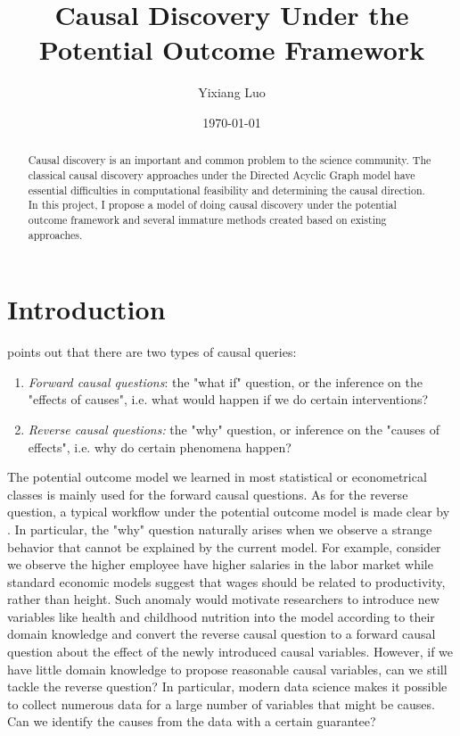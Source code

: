 \documentclass[11pt]{article}
\title{Causal Discovery Under the Potential Outcome Framework}
\author{Yixiang Luo}
\date{\today}
\begin{document}
\maketitle

\begin{abstract}
   Causal discovery is an important and common problem to the science community. The classical causal discovery approaches under the Directed Acyclic Graph model have essential difficulties in computational feasibility and determining the causal direction. In this project, I propose a model of doing causal discovery under the potential outcome framework and several immature methods created based on existing approaches. 
\end{abstract}


\section{Introduction}

\citet{gelman2011causality} points out that there are two types of causal queries:
\begin{enumerate}
    \item \textit{Forward causal questions}: the "what if" question, or the inference on the "effects of causes", i.e. what would happen if we do certain interventions?
    \item \textit{Reverse causal questions:} the "why" question, or inference on the "causes of effects", i.e. why do certain phenomena happen?
\end{enumerate}
The potential outcome model we learned in most statistical or econometrical classes is mainly used for the forward causal questions. As for the reverse question, a typical workflow under the potential outcome model is made clear by \citet{gelman2013ask}. In particular, the "why" question naturally arises when we observe a strange behavior that cannot be explained by the current model. For example, consider we observe the higher employee have higher salaries in the labor market while standard economic
models suggest that wages should be related to productivity, rather than height. Such anomaly would motivate researchers to introduce new variables like health and childhood nutrition into the model according to their domain knowledge and convert the reverse causal question to a forward causal question about the effect of the newly introduced causal variables. However, if we have little domain knowledge to propose reasonable causal variables, can we still tackle the reverse question? In particular, modern data science makes it possible to collect numerous data for a large number of variables that might be causes. Can we identify the causes from the data with a certain guarantee?
\end{document}
